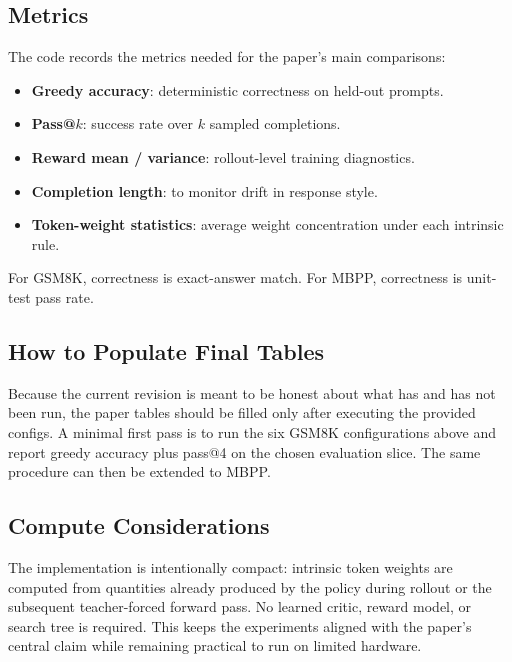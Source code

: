 \subsection{Metrics}

The code records the metrics needed for the paper's main comparisons:
\begin{itemize}
    \item \textbf{Greedy accuracy}: deterministic correctness on held-out prompts.
    \item \textbf{Pass@$k$}: success rate over $k$ sampled completions.
    \item \textbf{Reward mean / variance}: rollout-level training diagnostics.
    \item \textbf{Completion length}: to monitor drift in response style.
    \item \textbf{Token-weight statistics}: average weight concentration under each intrinsic rule.
\end{itemize}
For GSM8K, correctness is exact-answer match. For MBPP, correctness is unit-test pass rate.

\subsection{How to Populate Final Tables}

Because the current revision is meant to be honest about what has and has not been run, the paper tables should be filled only after executing the provided configs. A minimal first pass is to run the six GSM8K configurations above and report greedy accuracy plus pass@4 on the chosen evaluation slice. The same procedure can then be extended to MBPP.

\subsection{Compute Considerations}

The implementation is intentionally compact: intrinsic token weights are computed from quantities already produced by the policy during rollout or the subsequent teacher-forced forward pass. No learned critic, reward model, or search tree is required. This keeps the experiments aligned with the paper's central claim while remaining practical to run on limited hardware.
